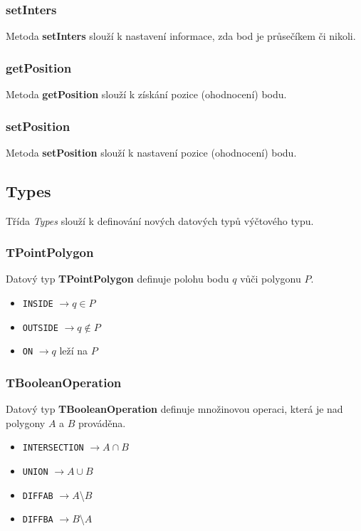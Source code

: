 \documentclass[a4paper, 12pt]{article}
\begin{document}
\subsubsection*{setInters}
Metoda \textbf{setInters} slouží k nastavení informace, zda bod je průsečíkem či nikoli. 

\subsubsection*{getPosition}
Metoda \textbf{getPosition} slouží k získání pozice (ohodnocení) bodu.

\subsubsection*{setPosition}
Metoda \textbf{setPosition} slouží k nastavení pozice (ohodnocení) bodu. 


\subsection{Types}
Třída \textit{Types} slouží k definování nových datových typů výčtového typu.

\subsubsection*{TPointPolygon}
Datový typ \textbf{TPointPolygon} definuje polohu bodu $q$ vůči polygonu $P$.\\ 
\begin{itemize}
\item \texttt{INSIDE} $\rightarrow q \in P$
\item \texttt{OUTSIDE} $\rightarrow q \notin P$
\item \texttt{ON} $\rightarrow q$ leží na $P$
\end{itemize}

\subsubsection*{TBooleanOperation}
Datový typ \textbf{TBooleanOperation} definuje množinovou operaci, která je nad polygony $A$ a $B$ prováděna.\\ 
\begin{itemize}
\item \texttt{INTERSECTION} $\rightarrow A \cap B$ 
\item \texttt{UNION} $\rightarrow A \cup B$
\item \texttt{DIFFAB} $\rightarrow A$\textbackslash $B$
\item \texttt{DIFFBA} $\rightarrow B$\textbackslash $A$
\end{itemize}
\end{document}

